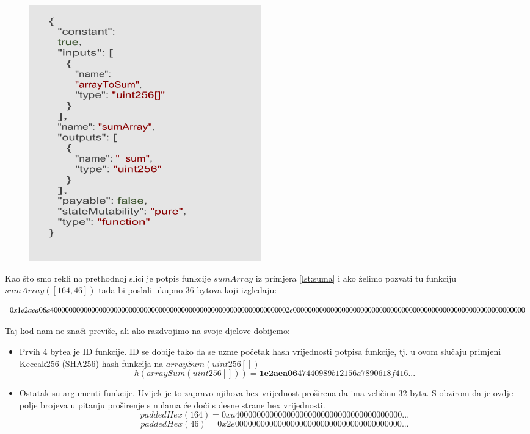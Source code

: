 \documentclass[a4paper,oneside,12pt]{memoir} %
\begin{document}
\begin{figure}[H]
\centering
\includegraphics[scale=0.8]{abi}
\label{fig:abi}
\end{figure}

Kao što smo rekli na prethodnoj slici je potpis funkcije $sumArray$ iz primjera \ref{lst:suma} i ako želimo pozvati tu funkciju $sumArray([164, 46])$ tada bi poslali ukupno 36 bytova koji izgledaju: 


\begin{dmath}
\label{eq:sumabi}
    0x1e2aea06a40000000000000000000000000000000000000000000\\00000000000000000002e000000000000000000000000000000000\\00000000000000000000000000000
\end{dmath}

Taj kod nam ne znači previše, ali ako razdvojimo na svoje djelove dobijemo: 

\begin{itemize}
    \item Prvih 4 bytea je ID funkcije. ID se dobije tako da se uzme početak hash vrijednosti potpisa funkcije, tj. u ovom slučaju primjeni Keccak256 (SHA256) hash funkcija na $arraySum(uint256[])$
    \begin{equation*}
        h(arraySum(uint256[])) = \textbf{1e2aea06}47440989b12156a7890618f416...
    \end{equation*}
    \item Ostatak su argumenti funkcije. Uvijek je to zapravo njihova hex vrijednost proširena da ima veličinu 32 byta. S obzirom da je ovdje polje brojeva u pitanju proširenje s nulama će doći s desne strane hex vrijednosti.
    \begin{equation*}
        paddedHex(164) = 0xa400000000000000000000000000000000000000...
    \end{equation*}
        \begin{equation*}
        paddedHex(46) = 0x2e000000000000000000000000000000000000000...
    \end{equation*}
\end{itemize}
\end{document}
